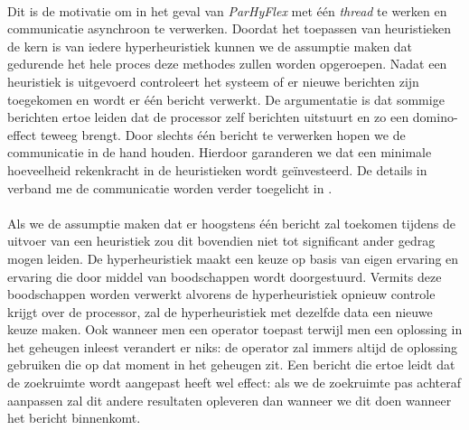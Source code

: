\paragraph{}
Dit is de motivatie om in het geval van \emph{ParHyFlex} met \'e\'en \emph{thread} te werken en communicatie asynchroon te verwerken. Doordat het toepassen van heuristieken de kern is van iedere hyperheuristiek kunnen we de assumptie maken dat gedurende het hele proces deze methodes zullen worden opgeroepen. Nadat een heuristiek is uitgevoerd controleert het systeem of er nieuwe berichten zijn toegekomen en wordt er \'e\'en bericht verwerkt. De argumentatie is dat sommige berichten ertoe leiden dat de processor zelf berichten uitstuurt en zo een domino-effect teweeg brengt. Door slechts \'e\'en bericht te verwerken hopen we de communicatie in de hand houden. Hierdoor garanderen we dat een minimale hoeveelheid rekenkracht in de heuristieken wordt ge\"investeerd. De details in verband me de communicatie worden verder toegelicht in .

\paragraph{}
Als we de assumptie maken dat er hoogstens \'e\'en bericht zal toekomen tijdens de uitvoer van een heuristiek zou dit bovendien niet tot significant ander gedrag mogen leiden. De hyperheuristiek maakt een keuze op basis van eigen ervaring en ervaring die door middel van boodschappen wordt doorgestuurd. Vermits deze boodschappen worden verwerkt alvorens de hyperheuristiek opnieuw controle krijgt over de processor, zal de hyperheuristiek met dezelfde data een nieuwe keuze maken. Ook wanneer men een operator toepast terwijl men een oplossing in het geheugen inleest verandert er niks: de operator zal immers altijd de oplossing gebruiken die op dat moment in het geheugen zit. Een bericht die ertoe leidt dat de zoekruimte wordt aangepast heeft wel effect: als we de zoekruimte pas achteraf aanpassen zal dit andere resultaten opleveren dan wanneer we dit doen wanneer het bericht binnenkomt.

